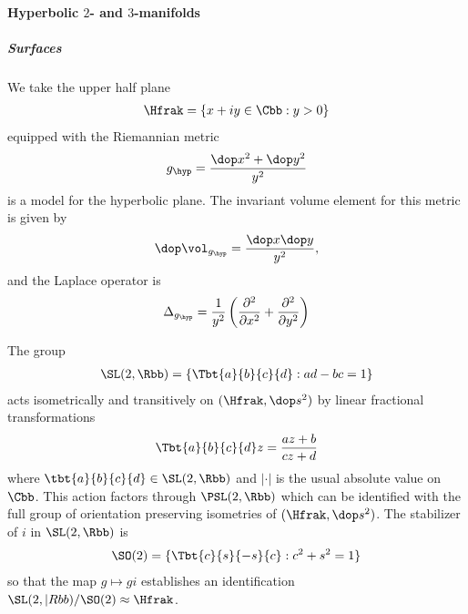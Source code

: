 \paragraph{Hyperbolic $2$- and $3$-manifolds}

\subparagraph{Surfaces}
We take the upper half plane
\begin{align*}
    \Hfrak = \{ x+iy \in \Cbb : y >0\}
\end{align*}
equipped with the Riemannian metric
\begin{align*}
    g_\hyp = \frac{\dop x^2 +\dop y^2}{y^2}
\end{align*}
is a model for the hyperbolic plane. The invariant volume element for this metric is given by
\begin{align*}
    \dop \vol_{g_\hyp} = \frac{\dop x \dop y}{y^2},
\end{align*}
and the Laplace operator is
\begin{align*}
    \Delta_{g_\hyp} = \frac{1}{y^2}\left( \frac{\partial^2 }{\partial x^2}+ \frac{\partial^2 }{\partial y^2} \right)
\end{align*}

The group
\begin{align*}
    \SL(2,\Rbb) = \left\{ \Tbt{a}{b}{c}{d}: ad-bc =1 \right\}
\end{align*}
acts isometrically and transitively on $(\Hfrak,\dop s^2)$ by linear fractional transformations
\begin{align*}
    \Tbt{a}{b}{c}{d} z = \frac{az+b}{cz+d} %
\end{align*}
where $\tbt{a}{b}{c}{d} \in \SL(2,\Rbb)$ and $|\cdot|$ is the usual absolute value on $\Cbb$. This action factors through $\PSL(2,\Rbb)$ which can be identified with the full group of orientation preserving isometries of $(\Hfrak,\dop s^2)$. The stabilizer of $i$ in $\SL(2,\Rbb)$ is
\begin{align*}
    \SO(2) = \{\Tbt{c}{s}{-s}{c}: c^2 + s^2 =1\}
\end{align*}
so that the map $g \mapsto g i$ establishes an identification $\SL(2,|Rbb) / \SO(2) \approx \Hfrak$.

